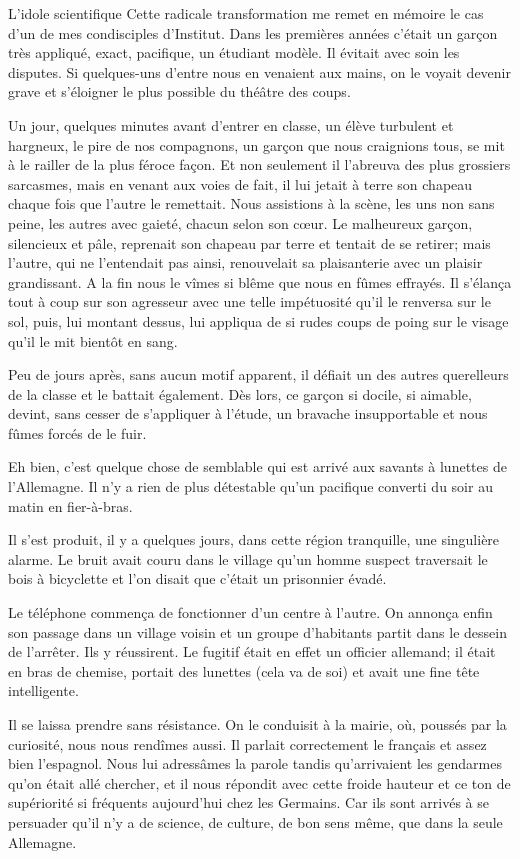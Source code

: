 \begin{chapter}{L'idole scientifique}
Cette radicale transformation me remet en mémoire le cas d'un de mes
condisciples d'Institut. Dans les premières années c'était un garçon
très appliqué, exact, pacifique, un étudiant modèle. Il évitait avec
soin les disputes. Si quelques-uns d'entre nous en venaient aux mains,
on le voyait devenir grave et s'éloigner le plus possible du théâtre des
coups.

Un jour, quelques minutes avant d'entrer en classe, un élève turbulent
et hargneux, le pire de nos compagnons, un garçon que nous craignions
tous, se mit à le railler de la plus féroce façon. Et non seulement il
l'abreuva des plus grossiers sarcasmes, mais en venant aux voies de
fait, il lui jetait à terre son chapeau chaque fois que l'autre le
remettait. Nous assistions à la scène, les uns non sans peine, les
autres avec gaieté, chacun selon son cœur. Le malheureux garçon,
silencieux et pâle, reprenait son chapeau par terre et tentait de se
retirer; mais l'autre, qui ne l'entendait pas ainsi, renouvelait sa
plaisanterie avec un plaisir grandissant. A la fin nous le vîmes si
blême que nous en fûmes effrayés. Il s'élança tout à coup sur son
agresseur avec une telle impétuosité qu'il le renversa sur le sol, puis,
lui montant dessus, lui appliqua de si rudes coups de poing sur le
visage qu'il le mit bientôt en sang.

Peu de jours après, sans aucun motif apparent, il défiait un des autres
querelleurs de la classe et le battait également. Dès lors, ce garçon si
docile, si aimable, devint, sans cesser de s'appliquer à l'étude, un
bravache insupportable et nous fûmes forcés de le fuir.

Eh bien, c'est quelque chose de semblable qui est arrivé aux savants à
lunettes de l'Allemagne. Il n'y a rien de plus détestable qu'un
pacifique converti du soir au matin en fier-à-bras.

Il s'est produit, il y a quelques jours, dans cette région tranquille,
une singulière alarme. Le bruit avait couru dans le village qu'un homme
suspect traversait le bois à bicyclette et l'on disait que c'était un
prisonnier évadé.

Le téléphone commença de fonctionner d'un centre à l'autre. On annonça
enfin son passage dans un village voisin et un groupe d'habitants partit
dans le dessein de l'arrêter. Ils y réussirent. Le fugitif était en
effet un officier allemand; il était en bras de chemise, portait des
lunettes (cela va de soi) et avait une fine tête intelligente.

Il se laissa prendre sans résistance. On le conduisit à la mairie, où,
poussés par la curiosité, nous nous rendîmes aussi. Il parlait
correctement le français et assez bien l'espagnol. Nous lui adressâmes
la parole tandis qu'arrivaient les gendarmes qu'on était allé chercher,
et il nous répondit avec cette froide hauteur et ce ton de supériorité
si fréquents aujourd'hui chez les Germains. Car ils sont arrivés à se
persuader qu'il n'y a de science, de culture, de bon sens même, que
dans la seule Allemagne.


\end{chapter}
